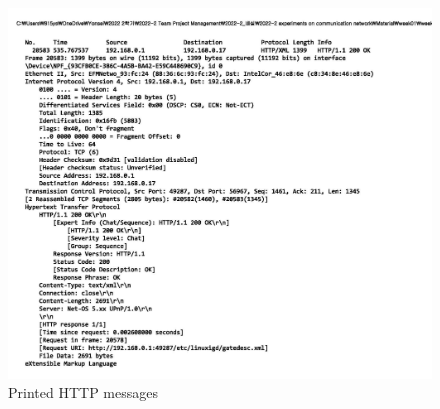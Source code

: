 \begin{enumerate}
             \vspace{-4mm}
            	\begin{figure}[!h]\centering
        			\includegraphics[width=.9\textwidth]{image/week01/1-2.png}
        			\caption{Printed HTTP messages}
            	\end{figure}
        \end{enumerate}
\newpage







